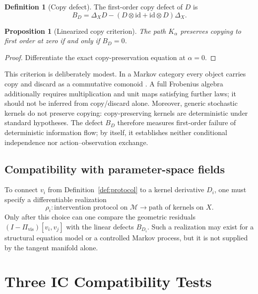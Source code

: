 \documentclass{article}
\theoremstyle{plain}
\newtheorem{proposition}[theorem]{Proposition}
\theoremstyle{definition}
\newtheorem{definition}[theorem]{Definition}
\theoremstyle{remark}
\newcommand{\M}{\mathcal M}
\newcommand{\Pvis}{\Pi_{\mathrm{vis}}}
\newcommand{\id}{\mathrm{id}}
\newcommand{\IC}{\textsc{IC}}
\begin{document}
\begin{definition}[Copy defect]
The first-order copy defect of \(D\) is
\[
  B_D
  =
  \Delta_XD
  -(D\otimes\id+\id\otimes D)\Delta_X .
\]
\end{definition}

\begin{proposition}[Linearized copy criterion]
\label{prop:copy}
The path \(K_\alpha\) preserves copying to first order at zero if and only if
\(B_D=0\).
\end{proposition}

\begin{proof}
Differentiate the exact copy-preservation equation at \(\alpha=0\).
\end{proof}

This criterion is deliberately modest.  In a Markov category every object
carries copy and discard as a commutative comonoid
\citep{fritz2020synthetic}.  A full Frobenius algebra additionally requires
multiplication and unit maps satisfying further laws; it should not be inferred
from copy/discard alone.  Moreover, generic stochastic kernels do not preserve
copying: copy-preserving kernels are deterministic under standard hypotheses.
The defect \(B_D\) therefore measures first-order failure of deterministic
information flow; by itself, it establishes neither conditional independence
nor action--observation exchange.

\subsection{Compatibility with parameter-space fields}

To connect \(v_i\) from Definition~\ref{def:protocol} to a kernel derivative \(D_i\), one
must specify a differentiable realization
\[
  \rho_i:
  \text{intervention protocol on }\M
  \longrightarrow
  \text{path of kernels on }X .
\]
Only after this choice can one compare the geometric residuals
\((I-\Pvis)[v_i,v_j]\) with the linear defects \(B_{D_i}\).  Such a realization
may exist for a structural equation model or a controlled Markov process, but
it is not supplied by the tangent manifold alone.

\section{Three \texorpdfstring{\IC}{IC} Compatibility Tests}
\label{sec:tests}
\end{document}

